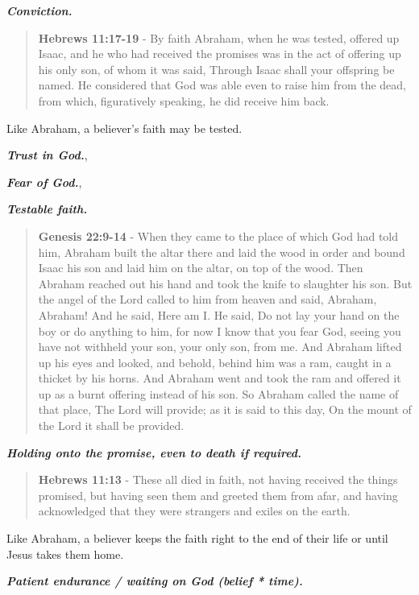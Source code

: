 \documentclass[11pt]{article}
\begin{document}
\emph{\textbf{Conviction.}}

\begin{quote}
\textbf{Hebrews 11:17-19} - By faith Abraham, when he was tested, offered up Isaac, and he who had received the promises was in the act of offering up his only son, of whom it was said, Through Isaac shall your offspring be named. He considered that God was able even to raise him from the dead, from which, figuratively speaking, he did receive him back.
\end{quote}

Like Abraham, a believer's faith may be tested.

\emph{\textbf{Trust in God.}},

\emph{\textbf{Fear of God.}},

\emph{\textbf{Testable faith.}}

\begin{quote}
\textbf{Genesis 22:9-14} - When they came to the place of which God had told him, Abraham built the altar there and laid the wood in order and bound Isaac his son and laid him on the altar, on top of the wood. Then Abraham reached out his hand and took the knife to slaughter his son. But the angel of the Lord called to him from heaven and said, Abraham, Abraham! And he said, Here am I. He said, Do not lay your hand on the boy or do anything to him, for now I know that you fear God, seeing you have not withheld your son, your only son, from me. And Abraham lifted up his eyes and looked, and behold, behind him was a ram, caught in a thicket by his horns. And Abraham went and took the ram and offered it up as a burnt offering instead of his son. So Abraham called the name of that place, The Lord will provide; as it is said to this day, On the mount of the Lord it shall be provided.
\end{quote}

\emph{\textbf{Holding onto the promise, even to death if required.}}

\begin{quote}
\textbf{Hebrews 11:13} - These all died in faith, not having received the things promised, but having seen them and greeted them from afar, and having acknowledged that they were strangers and exiles on the earth.
\end{quote}

Like Abraham, a believer keeps the faith right to the end of their life or until Jesus takes them home.

\emph{\textbf{Patient endurance / waiting on God (belief * time).}}
\end{document}
